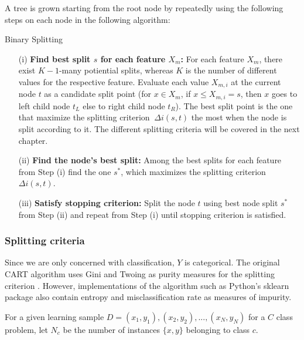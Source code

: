 A tree is grown starting from the root node by repeatedly using the following steps on each
node in the following algorithm:

\begin{algorithm}[H]
    \caption{Binary Splitting \cite{breiman1984classification}}
    \label{alg:binary_splitting}
    \SetAlgoLined
    \begin{itemize}
        \item[(i)] \textbf{Find best split \(s\) for each feature \(X_{m}\):}
        For each feature \(X_{m}\), there exist \(K-1\)-many potiential splits, 
        whereas \(K\) is the number of different values for the respective feature.
        Evaluate each value \(X_{m,i}\) at the current node \(t\) as a 
        candidate split point (for \(x \in X_{m}\), if \(x \leq X_{m,i}=s\),
        then \(x\) goes to left child node \(t_{L}\) else to right child node \(t_{R}\)).
        The best split point is the one that maximize the splitting criterion \(\ \Delta i(s,t) \) the most when the node is split according to it.
        The different splitting criteria will be covered in the next chapter.

        \item[(ii)] \textbf{Find the node’s best split:} Among the best splits for each feature from Step (i) find the 
        one \(s^{*}\), which maximizes the splitting criterion \(\Delta i(s,t)\).

        \item[(iii)] \textbf{Satisfy stopping criterion:} Split the node \(t\) using best node split \(s^{*}\) from Step (ii) 
        and repeat from Step (i) until stopping criterion is satisfied. 
    \end{itemize}
    \end{algorithm}


\subsubsection{Splitting criteria}
Since we are only concerned with classification, \(Y\) is categorical. The original CART algorithm uses Gini and Twoing as 
purity measures for the splitting criterion \cite{breiman1984classification}. 
However, implementations of the algorithm such as Python's sklearn package \cite{scikit2011learn} also contain entropy and misclassification rate as measures of impurity.

For a given learning sample \( D = {(x_{1},y_{1}), (x_{2}, y_{2}), ... , (x_{N}, y_{N})} \) 
for a \(C\) class problem, let \(N_{c}\) be the number of instances \( \{x,y\}  \)
belonging to class \(c\).

